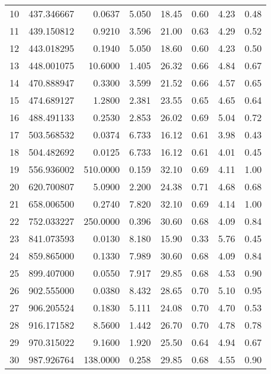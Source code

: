 \begin{longtable}{rrrrrrrr}
10    &   437.346667&    0.0637&  5.050&   18.45&   0.60&  4.23&  0.48\\
11    &   439.150812&    0.9210&  3.596&   21.00&   0.63&  4.29&  0.52\\
12    &   443.018295&    0.1940&  5.050&   18.60&   0.60&  4.23&  0.50\\
13    &   448.001075&   10.6000&  1.405&   26.32&   0.66&  4.84&  0.67\\
14    &   470.888947&    0.3300&  3.599&   21.52&   0.66&  4.57&  0.65\\
15    &   474.689127&    1.2800&  2.381&   23.55&   0.65&  4.65&  0.64\\
16    &   488.491133&    0.2530&  2.853&   26.02&   0.69&  5.04&  0.72\\
17    &   503.568532&    0.0374&  6.733&   16.12&   0.61&  3.98&  0.43\\
18    &   504.482692&    0.0125&  6.733&   16.12&   0.61&  4.01&  0.45\\
19    &   556.936002&  510.0000&  0.159&   32.10&   0.69&  4.11&  1.00\\
20    &   620.700807&    5.0900&  2.200&   24.38&   0.71&  4.68&  0.68\\
21    &   658.006500&    0.2740&  7.820&   32.10&   0.69&  4.14&  1.00\\
22    &   752.033227&  250.0000&  0.396&   30.60&   0.68&  4.09&  0.84\\
23    &   841.073593&    0.0130&  8.180&   15.90&   0.33&  5.76&  0.45\\
24    &   859.865000&    0.1330&  7.989&   30.60&   0.68&  4.09&  0.84\\
25    &   899.407000&    0.0550&  7.917&   29.85&   0.68&  4.53&  0.90\\
26    &   902.555000&    0.0380&  8.432&   28.65&   0.70&  5.10&  0.95\\
27    &   906.205524&    0.1830&  5.111&   24.08&   0.70&  4.70&  0.53\\
28    &   916.171582&    8.5600&  1.442&   26.70&   0.70&  4.78&  0.78\\
29    &   970.315022&    9.1600&  1.920&   25.50&   0.64&  4.94&  0.67\\
30    &   987.926764&  138.0000&  0.258&   29.85&   0.68&  4.55&  0.90\\
\hline
\end{longtable}



